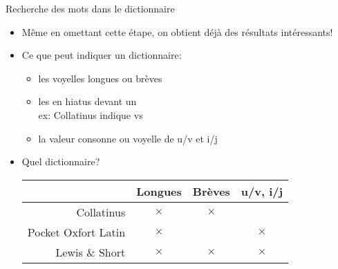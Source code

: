 \documentclass{beamer}
\newcommand{\lettre}[1]{\emph{\structure{#1}}}
\newcommand{\latin}[1]{\structure{#1}}
\newcommand{\crx}{$\times$}
\begin{document}
\begin{frame}{Recherche des mots dans le dictionnaire}  %

\begin{itemize}
\item Même en omettant cette étape, on obtient déjà des résultats intéressants!

\vfill

\item Ce que peut indiquer un dictionnaire:

\begin{itemize}
\item les voyelles longues ou brèves 
\item les \lettre{e} en hiatus devant un \lettre{u} \\
ex: Collatinus indique \latin{m{\u e}us} vs \latin{seu}
\item la valeur consonne ou voyelle de u/v et i/j
\end{itemize}

\vfill

\item Quel dictionnaire?

\begin{tabular}{r c c c}
				& Longues & Brèves & u/v, i/j \\
\hline
Collatinus		& \crx    & \crx   &  \\
Pocket Oxfort Latin & \crx &       & \crx \\
Lewis \& Short	& \crx    & \crx   & \crx \\
\hline
\end{tabular}


\end{itemize}

\end{frame} %
\end{document}
